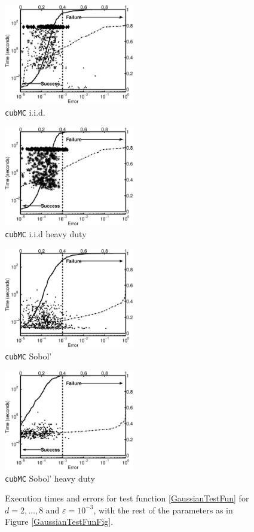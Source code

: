 \documentclass[graybox]{svmult}
\begin{document}
\begin{figure}
\centering
\begin{minipage}{5.7cm} \centering \includegraphics[width=5.7cm]{gaussiand=6iidErrTime.eps} \\ {\tt cubMC} i.i.d. \end{minipage}
\begin{minipage}{5.7cm} \centering \includegraphics[width=5.7cm]{gaussiand=6iidheavyErrTime.eps} \\ {\tt cubMC} i.i.d heavy duty \end{minipage}
\begin{minipage}{5.7cm} \centering \includegraphics[width=5.7cm]{gaussiand=6SobolErrTime.eps} \\ {\tt cubMC} Sobol' \end{minipage}
\begin{minipage}{5.7cm} \centering \includegraphics[width=5.7cm]{gaussiand=6SobolheavyErrTime.eps} \\ {\tt cubMC} Sobol' heavy duty \end{minipage}
\caption{Execution times and errors for test function \eqref{GaussianTestFun} for $d=2, \ldots, 8$ and $\varepsilon=10^{-3}$, with the rest of the parameters as in Figure \ref{GaussianTestFunFig}.\label{GaussianTestFunHDFig}}
\end{figure}
\end{document}
